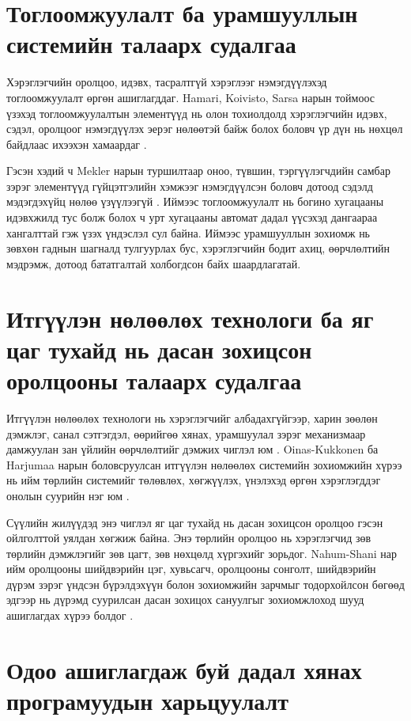 \section{Тоглоомжуулалт ба урамшууллын системийн талаарх судалгаа}

Хэрэглэгчийн оролцоо, идэвх, тасралтгүй хэрэглээг нэмэгдүүлэхэд тоглоомжуулалт өргөн ашиглагддаг. Hamari, Koivisto, Sarsa нарын тоймоос үзэхэд тоглоомжуулалтын элементүүд нь олон тохиолдолд хэрэглэгчийн идэвх, сэдэл, оролцоог нэмэгдүүлэх эерэг нөлөөтэй байж болох боловч үр дүн нь нөхцөл байдлаас ихээхэн хамаардаг \cite{ref13}.

Гэсэн хэдий ч Mekler нарын туршилтаар оноо, түвшин, тэргүүлэгчдийн самбар зэрэг элементүүд гүйцэтгэлийн хэмжээг нэмэгдүүлсэн боловч дотоод сэдэлд мэдэгдэхүйц нөлөө үзүүлээгүй \cite{ref14}. Иймээс тоглоомжуулалт нь богино хугацааны идэвхжилд тус болж болох ч урт хугацааны автомат дадал үүсэхэд дангаараа хангалттай гэж үзэх үндэслэл сул байна. Иймээс урамшууллын зохиомж нь зөвхөн гаднын шагналд тулгуурлах бус, хэрэглэгчийн бодит ахиц, өөрчлөлтийн мэдрэмж, дотоод бататгалтай холбогдсон байх шаардлагатай.

\section{Итгүүлэн нөлөөлөх технологи ба яг цаг тухайд нь дасан зохицсон оролцооны талаарх судалгаа}

Итгүүлэн нөлөөлөх технологи нь хэрэглэгчийг албадахгүйгээр, харин зөөлөн дэмжлэг, санал сэтгэгдэл, өөрийгөө хянах, урамшуулал зэрэг механизмаар дамжуулан зан үйлийн өөрчлөлтийг дэмжих чиглэл юм \cite{ref15}. Oinas-Kukkonen ба Harjumaa нарын боловсруулсан итгүүлэн нөлөөлөх системийн зохиомжийн хүрээ нь ийм төрлийн системийг төлөвлөх, хөгжүүлэх, үнэлэхэд өргөн хэрэглэгддэг онолын суурийн нэг юм \cite{ref15}.

Сүүлийн жилүүдэд энэ чиглэл яг цаг тухайд нь дасан зохицсон оролцоо гэсэн ойлголттой уялдан хөгжиж байна. Энэ төрлийн оролцоо нь хэрэглэгчид зөв төрлийн дэмжлэгийг зөв цагт, зөв нөхцөлд хүргэхийг зорьдог. Nahum-Shani нар ийм оролцооны шийдвэрийн цэг, хувьсагч, оролцооны сонголт, шийдвэрийн дүрэм зэрэг үндсэн бүрэлдэхүүн болон зохиомжийн зарчмыг тодорхойлсон бөгөөд эдгээр нь дүрэмд суурилсан дасан зохицох сануулгыг зохиомжлоход шууд ашиглагдах хүрээ болдог \cite{ref16}.

\section{Одоо ашиглагдаж буй дадал хянах програмуудын харьцуулалт}

